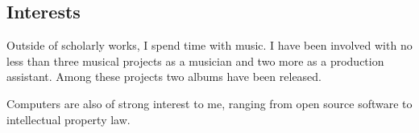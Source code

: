 \documentclass[margintitle,line]{res}
\begin{document}
\begin{resume}

\setlength{\parskip}{1ex}





\section{Interests}

Outside of scholarly works, I spend time with music. I have been involved with no less than three musical projects as a musician and two more as a production assistant. Among these projects two albums have been released. 

Computers are also of strong interest to me, ranging from open source software to intellectual property law.





\end{resume}
\end{document}
